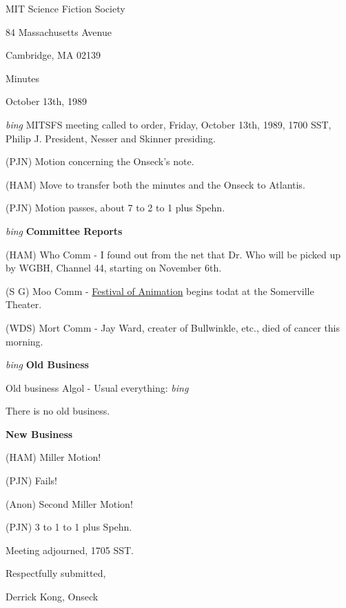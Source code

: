 \setlength{\topmargin}{-0.5in}
\setlength{\oddsidemargin}{-0.60in}
\setlength{\textheight}{9in}
\setlength{\textwidth}{6.5in}



\begin{center}
MIT Science Fiction Society

84 Massachusetts Avenue

Cambridge, MA 02139

\vspace{0.2in}
Minutes

October 13th, 1989

\end{center}
 
\vspace{0.15in}
{\em bing\/} MITSFS meeting called to order, Friday, October 13th, 1989,
1700 SST, Philip J. President, Nesser and Skinner presiding.

(PJN) Motion concerning the Onseck's note.

(HAM) Move to transfer both the minutes and the Onseck to Atlantis.

(PJN) Motion passes, about 7 to 2 to 1 plus Spehn.

\vspace{0.15in}
{\em bing\/} {\bf Committee Reports}

(HAM) Who Comm - I found out from the net that Dr. Who will be picked up
by WGBH, Channel 44, starting on November 6th.

(S G) Moo Comm - \underline{Festival of Animation} begins todat at the
Somerville Theater.

(WDS) Mort Comm - Jay Ward, creater of Bullwinkle, etc., died of
cancer this morning.

\vspace{0.15in}
{\em bing\/}  {\bf Old Business}

Old business Algol - Usual everything: {\em bing\/}

There is no old business.

\vspace{0.15in}
{\bf New Business}

(HAM) Miller Motion!

(PJN) Fails!

(Anon) Second Miller Motion!

(PJN) 3 to 1 to 1 plus Spehn.

Meeting adjourned, 1705 SST.

\vspace{0.15in}
\begin{center}
Respectfully submitted,

Derrick Kong, Onseck
\end{center}

